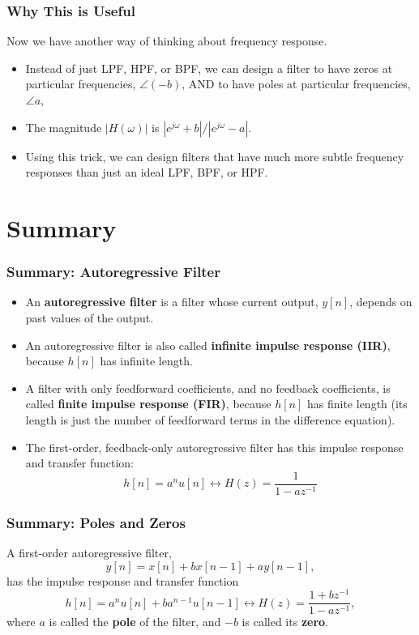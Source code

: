\documentclass{beamer}
\begin{document}
\begin{frame}
  \centerline{}
\end{frame}

\begin{frame}
  \frametitle{Why This is Useful}

  Now we have another way of thinking about frequency response.
  \begin{itemize}
    \item Instead of just LPF, HPF, or BPF, we can design a filter to have
      zeros at particular frequencies, $\angle (-b)$, AND to have
      poles at particular frequencies, $\angle a$,
    \item The magnitude $|H(\omega)|$ is
      $|e^{j\omega}+b|/|e^{j\omega}-a|$.
    \item Using this trick, we can design filters that have much more
      subtle frequency responses than just an ideal LPF, BPF, or HPF.
  \end{itemize}
\end{frame}


\section[Summary]{Summary}
\setcounter{subsection}{1}

\begin{frame}
  \frametitle{Summary: Autoregressive Filter}
  \begin{itemize}
  \item An {\bf autoregressive filter} is a filter whose current output,
    $y[n]$, depends on  past values of the output.
  \item An autoregressive filter is also called {\bf infinite impulse response (IIR)},
    because $h[n]$ has infinite length.
  \item A filter with only feedforward coefficients, and no feedback coefficients, is called
    {\bf finite impulse response (FIR)}, because $h[n]$ has finite length (its length is
    just the number of feedforward terms in the difference equation).
  \item The first-order, feedback-only autoregressive filter has this
    impulse response and transfer function:
    \[
    h[n]=a^n u[n] \leftrightarrow H(z)  = \frac{1}{1-az^{-1}}
    \]
  \end{itemize}
\end{frame}
\begin{frame}
  \frametitle{Summary: Poles and Zeros}
  A first-order autoregressive filter,
  \[
  y[n] = x[n]+bx[n-1]+ay[n-1],
  \]
  has the impulse response and transfer function
  \[
  h[n]=a^n u[n]+ba^{n-1}u[n-1] \leftrightarrow H(z)  = \frac{1+bz^{-1}}{1-az^{-1}},
  \]
  where $a$ is called the {\bf pole} of the filter, and $-b$ is called
  its {\bf zero}.
\end{frame}
\end{document}
